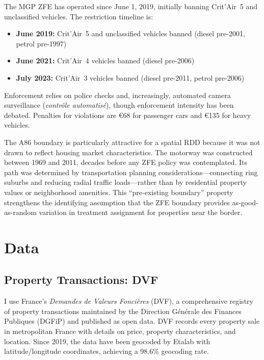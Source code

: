 \documentclass[12pt]{article}
\begin{document}
The MGP ZFE has operated since June 1, 2019, initially banning Crit'Air~5 and unclassified vehicles. The restriction timeline is:

\begin{itemize}
    \item \textbf{June 2019:} Crit'Air~5 and unclassified vehicles banned (diesel pre-2001, petrol pre-1997)
    \item \textbf{June 2021:} Crit'Air~4 vehicles banned (diesel pre-2006)
    \item \textbf{July 2023:} Crit'Air~3 vehicles banned (diesel pre-2011, petrol pre-2006)
\end{itemize}

Enforcement relies on police checks and, increasingly, automated camera surveillance (\textit{contr\^ole automatis\'e}), though enforcement intensity has been debated. Penalties for violations are \euro{}68 for passenger cars and \euro{}135 for heavy vehicles.

The A86 boundary is particularly attractive for a spatial RDD because it was not drawn to reflect housing market characteristics. The motorway was constructed between 1969 and 2011, decades before any ZFE policy was contemplated. Its path was determined by transportation planning considerations---connecting ring suburbs and reducing radial traffic loads---rather than by residential property values or neighborhood amenities. This ``pre-existing boundary'' property strengthens the identifying assumption that the ZFE boundary provides as-good-as-random variation in treatment assignment for properties near the border.


\section{Data}

\subsection{Property Transactions: DVF}

I use France's \textit{Demandes de Valeurs Fonci\`eres} (DVF), a comprehensive registry of property transactions maintained by the Direction G\'en\'erale des Finances Publiques (DGFiP) and published as open data. DVF records every property sale in metropolitan France with details on price, property characteristics, and location. Since 2019, the data have been geocoded by Etalab with latitude/longitude coordinates, achieving a 98.6\% geocoding rate.
\end{document}
